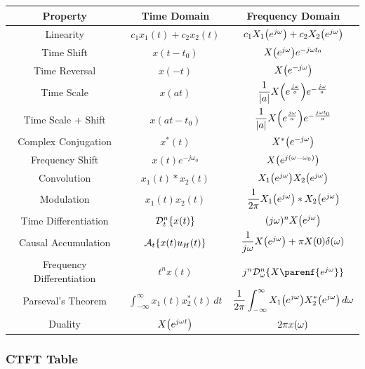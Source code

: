 \documentclass[11pt]{article}
\begin{document}
  \bgroup
  \renewcommand{\arraystretch}{2.1}
  \setlength{\tabcolsep}{0.55cm}
  \large\begin{tabular}{c|c|c}
    Property & Time Domain & Frequency Domain \\
    \toprule
    Linearity & \(c_1x_1(t) + c_2x_2(t)\) & \(c_1X_1{\left( e^{j\omega} \right)} + c_2X_2{\left( e^{j\omega} \right)}\) \\
    Time Shift & \(x(t - t_0)\) & \(X{\left( e^{j\omega} \right)}e^{-j\omega t_0}\)\\
    Time Reversal & \(x(-t)\) & \(X{\left( e^{-j\omega} \right)}\)\\
    Time Scale & \(x(at)\) & \(\dfrac{1}{|a|}X{\left( e^{\frac{j\omega}{a}} \right)}e^{-\frac{j\omega}{a}}\)\\
    Time Scale + Shift & \(x(at - t_0)\) & \(\dfrac{1}{|a|}X{\left( e^{\frac{j\omega}{a}} \right)}e^{-\frac{j\omega t_0}{a}}\)\\
    Complex Conjugation & \(x^*(t)\) & \(X^*{\left( e^{-j\omega} \right)}\)\\
    Frequency Shift & \(x(t)e^{-j\omega_0}\) & \(X{\left( e^{j(\omega - \omega_0)} \right)}\)\\
    Convolution & \(x_1(t) * x_2(t)\) & \(X_1{\left( e^{j\omega} \right)}X_2{\left( e^{j\omega} \right)}\) \\
    Modulation & \(x_1(t)x_2(t)\) & \(\dfrac{1}{2\pi}X_1{\left( e^{j\omega} \right)} * X_2{\left( e^{j\omega} \right)}\) \\
    Time Differentiation & \(\mathcal{D}_t^n\{x(t)\}\) & \((j\omega)^nX{\left( e^{j\omega} \right)}\) \\
    Causal Accumulation &
    \(\mathcal{A}_t\{x(t)u_H(t)\}\) & \(\dfrac{1}{j\omega}X{\left( e^{j\omega} \right)} + \pi X(0)\delta(\omega)\) \\
    Frequency Differentiation & \(t^n x(t)\) & \(j^n\D_{\omega}^n\{X\parenf{e^{j\omega}}\}\) \\
    Parseval's Theorem & \(\displaystyle\int_{-\infty}^{\infty} x_1(t)x^*_2(t)\,dt \) &
    \(\dfrac{1}{2\pi}\displaystyle\int_{-\infty}^{\infty} X_1{\left( e^{j\omega} \right)}X_2^*{\left( e^{j\omega} \right)} \,d\omega\) \\
    Duality & \(X{\left( e^{j\omega t} \right)}\) & \(2\pi x{\left( \omega \right)}\)
  \end{tabular}
  \egroup

  \pagebreak

  \subsubsection{CTFT Table}
\end{document}
